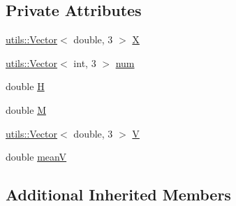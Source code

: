 \subsection*{Private Attributes}
\begin{DoxyCompactItemize}
\item 
\hyperlink{singletonutils_1_1Vector}{utils\+::\+Vector}$<$ double, 3 $>$ \hyperlink{classParticleGenerator_aaf7df826188798efb4f9ae55daa54a5a}{X}
\item 
\hyperlink{singletonutils_1_1Vector}{utils\+::\+Vector}$<$ int, 3 $>$ \hyperlink{classParticleGenerator_a44e5ef018a25b22a109418374b60ff7f}{num}
\item 
double \hyperlink{classParticleGenerator_ab8972c20c48ec8a4b3dd8f216e127f19}{H}
\item 
double \hyperlink{classParticleGenerator_a7b91b2f1e4cd7ef3b04fac4923f46490}{M}
\item 
\hyperlink{singletonutils_1_1Vector}{utils\+::\+Vector}$<$ double, 3 $>$ \hyperlink{classParticleGenerator_a692c7f5fd0509035f0a1a225996021e2}{V}
\item 
double \hyperlink{classParticleGenerator_ae399ed7c0cc1e2a6f467f2fd2a8d96ad}{mean\+V}
\end{DoxyCompactItemize}
\subsection*{Additional Inherited Members}


